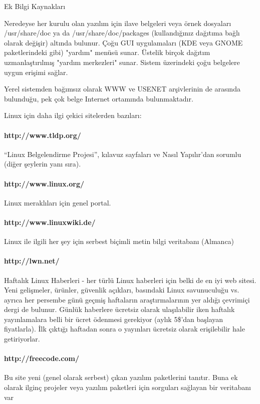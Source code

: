 \begin{section}{Ek Bilgi Kaynakları}

Neredeyse her kurulu olan yazılım için ilave belgeleri veya örnek dosyaları /usr/share/doc ya da /usr/share/doc/packages (kullandığınız dağıtıma bağlı olarak değişir) altında bulunur. Çoğu GUI uygulamaları (KDE veya GNOME paketlerindeki gibi) "yardım" menüsü sunar. Üstelik birçok dağıtım uzmanlaştırılmış "yardım merkezleri" sunar. Sistem üzerindeki çoğu belgelere uygun erişimi sağlar.

Yerel sistemden bağımsız olarak WWW ve USENET arşivlerinin de arasında bulunduğu, pek çok belge Internet ortamında bulunmaktadır. 

Linux için daha ilgi çekici sitelerden bazıları:
\paragraph{http://www.tldp.org/}{“Linux Belgelendirme Projesi”, kılavuz sayfaları ve Nasıl Yapılır'dan sorumlu (diğer şeylerin yanı sıra).}
\paragraph{http://www.linux.org/}{Linux meraklıları için genel portal.}
\paragraph{http://www.linuxwiki.de/}{Linux ile ilgili her şey için serbest biçimli metin bilgi veritabanı (Almanca)}
\paragraph{http://lwn.net/}{Haftalık Linux Haberleri - her türlü Linux haberleri için belki de en iyi web sitesi. Yeni gelişmeler, ürünler, güvenlik açıkları, basındaki Linux savunuculuğu vs. ayrıca her persembe günü geçmiş haftaların araştırmalarının yer aldığı çevrimiçi dergi de bulunur. Günlük haberlere ücretsiz olarak ulaşılabilir iken haftalık yayınlamalara belli bir ücret ödenmesi gerekiyor (aylık 5\$'dan başlayan fiyatlarla). İlk çıktığı haftadan sonra o yayınları ücretsiz olarak erişilebilir hale getiriyorlar.}
\paragraph{http://freecode.com/}{Bu site yeni (genel olarak serbest) çıkan yazılım paketlerini tanıtır. Buna ek olarak ilginç projeler veya yazılım paketleri için sorguları sağlayan bir veritabanı var}

\end{section}
